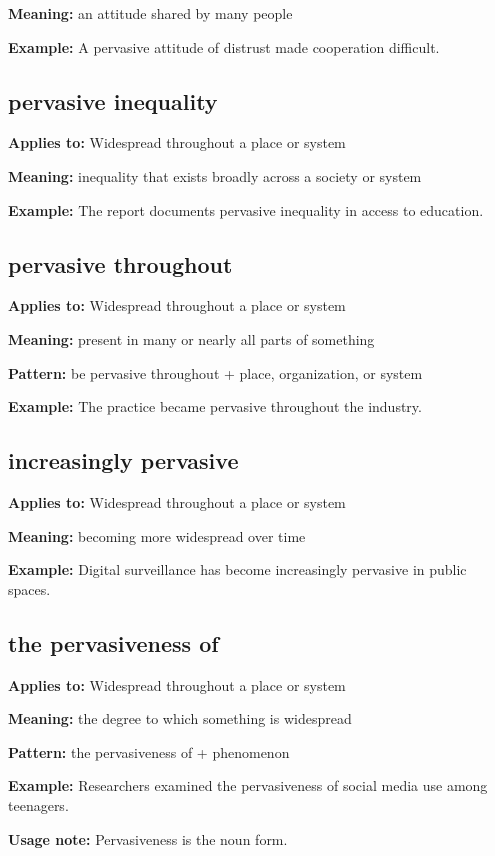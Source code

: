\documentclass[11pt]{article}
\begin{document}
\textbf{Meaning:} an attitude shared by many people

\textbf{Example:} A pervasive attitude of distrust made cooperation difficult.

\subsection{pervasive inequality}
\textbf{Applies to:} Widespread throughout a place or system

\textbf{Meaning:} inequality that exists broadly across a society or system

\textbf{Example:} The report documents pervasive inequality in access to education.

\subsection{pervasive throughout}
\textbf{Applies to:} Widespread throughout a place or system

\textbf{Meaning:} present in many or nearly all parts of something

\textbf{Pattern:} be pervasive throughout + place, organization, or system

\textbf{Example:} The practice became pervasive throughout the industry.

\subsection{increasingly pervasive}
\textbf{Applies to:} Widespread throughout a place or system

\textbf{Meaning:} becoming more widespread over time

\textbf{Example:} Digital surveillance has become increasingly pervasive in public spaces.

\subsection{the pervasiveness of}
\textbf{Applies to:} Widespread throughout a place or system

\textbf{Meaning:} the degree to which something is widespread

\textbf{Pattern:} the pervasiveness of + phenomenon

\textbf{Example:} Researchers examined the pervasiveness of social media use among teenagers.

\textbf{Usage note:} Pervasiveness is the noun form.
\end{document}
